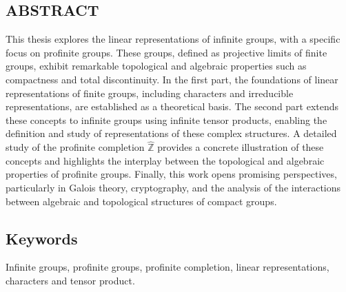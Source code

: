 \documentclass[a4paper, 14pt]{report}
\newcommand{\applyfontsize}{%
	\fontsize{12}{12}\selectfont
}
\begin{document}
\begin{onehalfspace}
		\chapter*{ABSTRACT}
		{
			\applyfontsize %
			This thesis explores the linear representations of infinite groups, with a specific focus on profinite groups. These groups, defined as projective limits of finite groups, exhibit remarkable topological and algebraic properties such as compactness and total discontinuity. In the first part, the foundations of linear representations of finite groups, including characters and irreducible representations, are established as a theoretical basis. The second part extends these concepts to infinite groups using infinite tensor products, enabling the definition and study of representations of these complex structures.  
			A detailed study of the profinite completion \( \widehat{\mathbb{Z}} \) provides a concrete illustration of these concepts and highlights the interplay between the topological and algebraic properties of profinite groups. Finally, this work opens promising perspectives, particularly in Galois theory, cryptography, and the analysis of the interactions between algebraic and topological structures of compact groups.
			
			\section*{Keywords}
			Infinite groups, profinite groups, profinite completion, linear representations, characters and tensor product.
			
		}
		
		
		
		
		

\end{onehalfspace}
\end{document}
